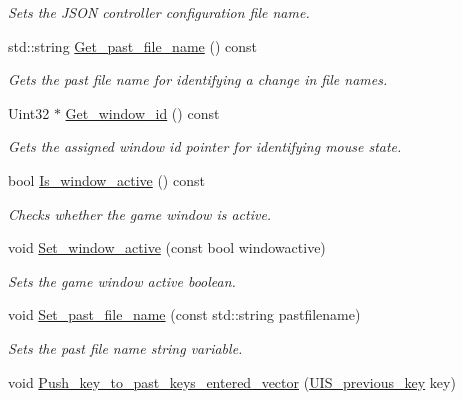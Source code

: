 \begin{DoxyCompactItemize}
\begin{DoxyCompactList}\small\item\em Sets the J\+S\+ON controller configuration file name. \end{DoxyCompactList}\item 
std\+::string \hyperlink{classjetfuel_1_1control_1_1UIS__manager_aa793909d552073e59d9c3cdefe9e6618}{Get\+\_\+past\+\_\+file\+\_\+name} () const
\begin{DoxyCompactList}\small\item\em Gets the past file name for identifying a change in file names. \end{DoxyCompactList}\item 
Uint32 $\ast$ \hyperlink{classjetfuel_1_1control_1_1UIS__manager_a31b973b02f3a17afed1de151db5704ed}{Get\+\_\+window\+\_\+id} () const
\begin{DoxyCompactList}\small\item\em Gets the assigned window id pointer for identifying mouse state. \end{DoxyCompactList}\item 
bool \hyperlink{classjetfuel_1_1control_1_1UIS__manager_a993f8dbe8b39656a426bbd7aa5568c14}{Is\+\_\+window\+\_\+active} () const
\begin{DoxyCompactList}\small\item\em Checks whether the game window is active. \end{DoxyCompactList}\item 
void \hyperlink{classjetfuel_1_1control_1_1UIS__manager_aadc46749d1ea102cf957bcc6da98654e}{Set\+\_\+window\+\_\+active} (const bool windowactive)
\begin{DoxyCompactList}\small\item\em Sets the game window active boolean. \end{DoxyCompactList}\item 
void \hyperlink{classjetfuel_1_1control_1_1UIS__manager_a5fff180a335246d905531a00bc34fbe8}{Set\+\_\+past\+\_\+file\+\_\+name} (const std\+::string pastfilename)
\begin{DoxyCompactList}\small\item\em Sets the past file name string variable. \end{DoxyCompactList}\item 
void \hyperlink{classjetfuel_1_1control_1_1UIS__manager_afb60b0c7ac07dbe3657eb8a203c4bd45}{Push\+\_\+key\+\_\+to\+\_\+past\+\_\+keys\+\_\+entered\+\_\+vector} (\hyperlink{structjetfuel_1_1control_1_1UIS__previous__key}{U\+I\+S\+\_\+previous\+\_\+key} key)

\end{DoxyCompactItemize}
